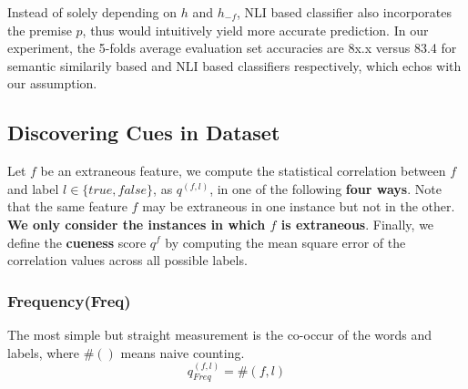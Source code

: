 Instead of solely depending on $h$ and $h_{-f}$, NLI based classifier also incorporates the premise $p$, thus would intuitively
yield more accurate prediction. In our experiment, the 5-folds average evaluation set accuracies are 8x.x versus 83.4 for semantic similarily based and NLI based classifiers respectively, which echos with our 
assumption.

\subsection{Discovering Cues in Dataset}
\label{sec:evaldata}
Let $f$ be an extraneous feature, we compute the statistical 
correlation between $f$ and label $l \in \{true, false\}$, as $q^{(f,l)}$, in one of the 
following \textbf{four ways}. Note that the same feature $f$ may be 
extraneous in one instance but not in the other. \textbf{We only consider the instances
in which $f$ is extraneous}.  
Finally, we define the \textbf{cueness} score $q^f$ by computing the mean square error of
the correlation values across all possible labels.
%
%

\subsubsection{Frequency(Freq)}
The most simple but straight measurement is the co-occur of the
words and labels, where $\#()$ means naive counting.
\begin{equation}
    q_{Freq}^{(f,l)} = \#(f, l)
\end{equation}


